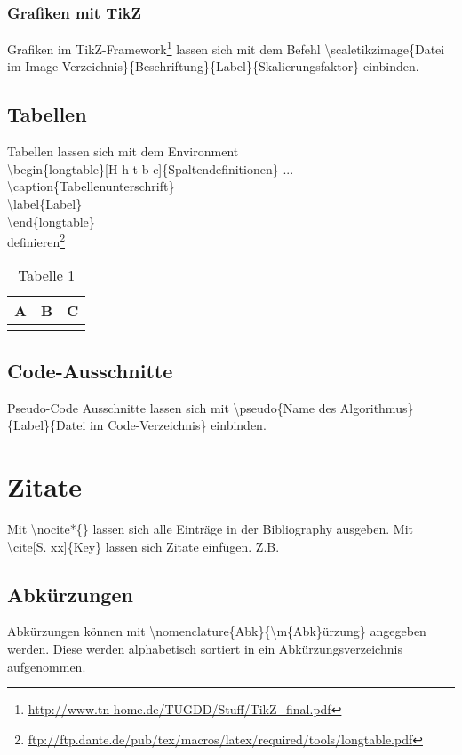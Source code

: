 \subsubsection{Grafiken mit TikZ}
Grafiken im TikZ-Framework\footnote{\url{http://www.tn-home.de/TUGDD/Stuff/TikZ_final.pdf}} lassen sich mit dem Befehl \textbackslash scaletikzimage\{Datei im Image Verzeichnis\}\{Beschriftung\}\{Label\}\{Skalierungsfaktor\} einbinden. 
\subsection{Tabellen}
Tabellen lassen sich mit dem Environment\\
\textbackslash begin\{longtable\}[H h t b c]\{Spaltendefinitionen\} ...\\
\qquad\qquad \textbackslash caption\{Tabellenunterschrift\}\\
\qquad\qquad \textbackslash label\{Label\}\\
\textbackslash end\{longtable\}\\
 definieren\footnote{\url{ftp://ftp.dante.de/pub/tex/macros/latex/required/tools/longtable.pdf}}\\
\begin{longtable}[H]{|p{}|p{}|p{}|}
\hline
A&B&C\\
\hline
\caption{Tabelle 1}
\label{tab:tab1}
\end{longtable}
\subsection{Code-Ausschnitte}
Pseudo-Code Ausschnitte lassen sich mit \textbackslash pseudo\{Name des Algorithmus\}\{Label\}\{Datei im Code-Verzeichnis\} einbinden.
\section{Zitate}
Mit \textbackslash nocite*\{\} lassen sich alle Einträge in der Bibliography ausgeben. Mit \textbackslash cite[S. xx]\{Key\} lassen sich Zitate einfügen. Z.B. \cite[S. 234]{Kurose12} \nocite*{}
\subsection{Abkürzungen}

Abkürzungen können mit \textbackslash nomenclature\{Abk\}\{\textbackslash m\{Abk\}ürzung\}  angegeben werden. Diese werden alphabetisch sortiert in ein Abkürzungsverzeichnis aufgenommen.

